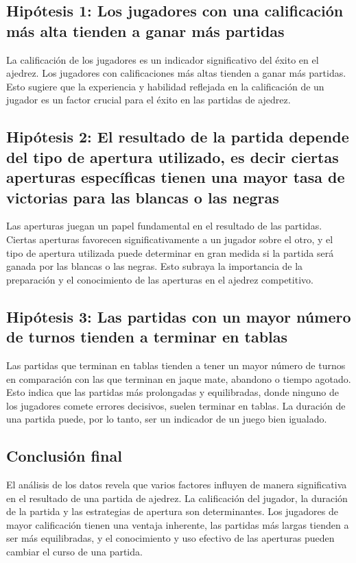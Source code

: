 \documentclass[a4paper, 12pt]{article}
\begin{document}
\subsection{Hipótesis 1: Los jugadores con una calificación más alta tienden a ganar más partidas}
La calificación de los jugadores es un indicador significativo del éxito en el ajedrez. Los jugadores con calificaciones más altas tienden a ganar más partidas. Esto sugiere que la experiencia y habilidad reflejada en la calificación de un jugador es un factor crucial para el éxito en las partidas de ajedrez.

\subsection{Hipótesis 2: El resultado de la partida depende del tipo de apertura utilizado, es decir ciertas aperturas específicas tienen una mayor tasa de victorias para las blancas o las negras}
Las aperturas juegan un papel fundamental en el resultado de las partidas. Ciertas aperturas favorecen significativamente a un jugador sobre el otro, y el tipo de apertura utilizada puede determinar en gran medida si la partida será ganada por las blancas o las negras. Esto subraya la importancia de la preparación y el conocimiento de las aperturas en el ajedrez competitivo.

\subsection{Hipótesis 3: Las partidas con un mayor número de turnos tienden a terminar en tablas}
Las partidas que terminan en tablas tienden a tener un mayor número de turnos en comparación con las que terminan en jaque mate, abandono o tiempo agotado. Esto indica que las partidas más prolongadas y equilibradas, donde ninguno de los jugadores comete errores decisivos, suelen terminar en tablas. La duración de una partida puede, por lo tanto, ser un indicador de un juego bien igualado.

\subsection{Conclusión final}
El análisis de los datos revela que varios factores influyen de manera significativa en el resultado de una partida de ajedrez. La calificación del jugador, la duración de la partida y las estrategias de apertura son determinantes. Los jugadores de mayor calificación tienen una ventaja inherente, las partidas más largas tienden a ser más equilibradas, y el conocimiento y uso efectivo de las aperturas pueden cambiar el curso de una partida.
\end{document}

